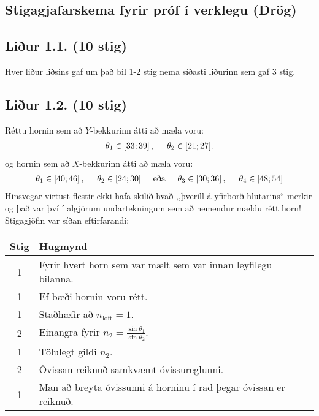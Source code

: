 \newpage

\begin{tcolorbox}

\section*{Stigagjafarskema fyrir próf í verklegu (Drög)}

\subsection*{Liður 1.1. (10 stig)}

Hver liður liðsins gaf um það bil 1-2 stig nema síðasti liðurinn sem gaf 3 stig.

\subsection*{Liður 1.2. (10 stig)}

Réttu hornin sem að $Y$-bekkurinn átti að mæla voru:
\begin{align*}
    \theta_1 \in \left[ 33;39 \right], \hspace{0.5cm} \theta_2 \in [21;27].
\end{align*}
og hornin sem að $X$-bekkurinn átti að mæla voru:
\begin{align*}
    \theta_1 \in \left[ 40;46 \right], \hspace{0.5cm} \theta_2 \in [24;30] \hspace{0.5cm} \text{eða} \hspace{0.5cm} \theta_3 \in \left[ 30;36 \right], \hspace{0.5cm} \theta_4 \in [48;54]
\end{align*}
Hinsvegar virtust flestir ekki hafa skilið hvað ,,þverill á yfirborð hlutarins`` merkir og það var því í algjörum undartekningum sem að nemendur mældu rétt horn! Stigagjöfin var síðan eftirfarandi:

\begin{table}[H]
    \centering
    \begin{tabular}{|c|l|}
    \hline
       \textbf{Stig}  & \textbf{Hugmynd}   \\ \hline \hline
        1  & Fyrir hvert horn sem var mælt sem var innan leyfilegu bilanna. \\ \hline
        1  & Ef bæði hornin voru rétt.  \\ \hline
        1  & Staðhæfir að $n_{\text{loft}} = 1$. \\ \hline
        2  & Einangra fyrir $n_2 = \frac{\sin\theta_1}{\sin\theta_2}$. \\ \hline
        1  & Tölulegt gildi $n_2$. \\ \hline
        2  & Óvissan reiknuð samkvæmt óvissureglunni. \\ \hline
        1  & Man að breyta óvissunni á horninu í rad þegar óvissan er reiknuð. \\ \hline
    \end{tabular}
\end{table}


\end{tcolorbox}
